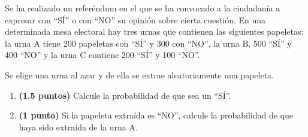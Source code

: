 
Se ha realizado un referéndum en el que se ha convocado a la ciudadanía a expresar con ``SÍ'' o con ``NO'' su opinión sobre cierta cuestión. En una determinada mesa electoral hay tres urnas que contienen las siguientes papeletas: la urna A tiene 200 papeletas con ``SÍ'' y 300 con ``NO'', la urna B, 500 ``SÍ'' y 400 ``NO'' y la urna C contiene 200 ``SÍ'' y 100 ``NO''.

Se elige una urna al azar y de ella se extrae aleatoriamente una papeleta.
\begin{enumerate}[label=\alph*)]
\item \textbf{(1.5 puntos)} Calcule la probabilidad de que sea un ``SÍ''.
\item \textbf{(1 punto)} Si la papeleta extraída es ``NO'', calcule la probabilidad de que haya sido extraída de la urna A.
\end{enumerate}
